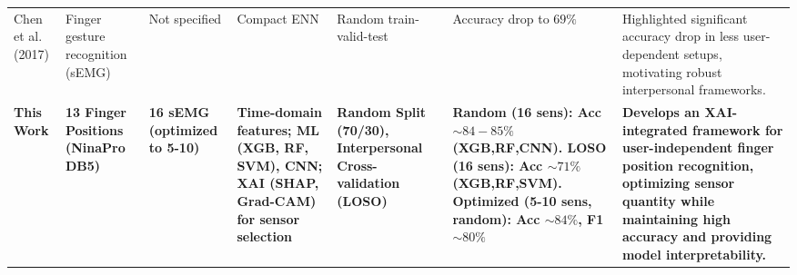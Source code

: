 \documentclass[preprint,12pt]{elsarticle}
\begin{document}
\begin{table}
{\begin{tabular}{L{4cm} L{3.5cm} C{1.5cm} L{3cm} L{2.5cm} L{7cm} L{7cm}}
Chen et al. (2017) \cite{s20030672} & Finger gesture recognition (sEMG) & Not specified & Compact ENN & Random train-valid-test & Accuracy drop to $69\%$ & Highlighted significant accuracy drop in less user-dependent setups, motivating robust interpersonal frameworks. \\
\addlinespace
\hline
\addlinespace
\textbf{This Work} & \textbf{13 Finger Positions (NinaPro DB5)} & \textbf{16 sEMG (optimized to 5-10)} & \textbf{Time-domain features; ML (XGB, RF, SVM), CNN; XAI (SHAP, Grad-CAM) for sensor selection} & \textbf{Random Split (70/30), Interpersonal Cross-validation (LOSO)} & \textbf{Random (16 sens): Acc $\sim 84-85\%$ (XGB,RF,CNN). LOSO (16 sens): Acc $\sim 71\%$ (XGB,RF,SVM). Optimized (5-10 sens, random): Acc $\sim 84\%$, F1 $\sim 80\%$} & \textbf{Develops an XAI-integrated framework for user-independent finger position recognition, optimizing sensor quantity while maintaining high accuracy and providing model interpretability.} \\
\bottomrule
\end{tabular}%
}
\vspace{2mm}
\end{table}


\end{document}
